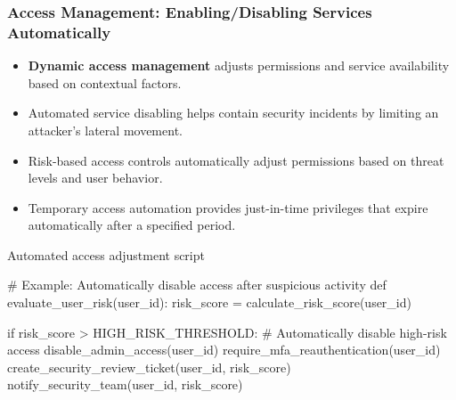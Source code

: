 \documentclass{beamer}
\begin{document}
\begin{frame}[fragile]
  \frametitle{Access Management: Enabling/Disabling Services Automatically}
  
  \begin{itemize}
    \item \textbf{Dynamic access management} adjusts permissions and service availability based on contextual factors.
    \item Automated service disabling helps contain security incidents by limiting an attacker's lateral movement.
    \item Risk-based access controls automatically adjust permissions based on threat levels and user behavior.
    \item Temporary access automation provides just-in-time privileges that expire automatically after a specified period.
  \end{itemize}
  
  \begin{block}{Automated access adjustment script}
    \tiny
    \begin{semiverbatim}
# Example: Automatically disable access after suspicious activity
def evaluate_user_risk(user_id):
    risk_score = calculate_risk_score(user_id)
    
    if risk_score > HIGH_RISK_THRESHOLD:
        # Automatically disable high-risk access
        disable_admin_access(user_id)
        require_mfa_reauthentication(user_id)
        create_security_review_ticket(user_id, risk_score)
        notify_security_team(user_id, risk_score)
    \end{semiverbatim}
  \end{block}
\end{frame}
\end{document}
